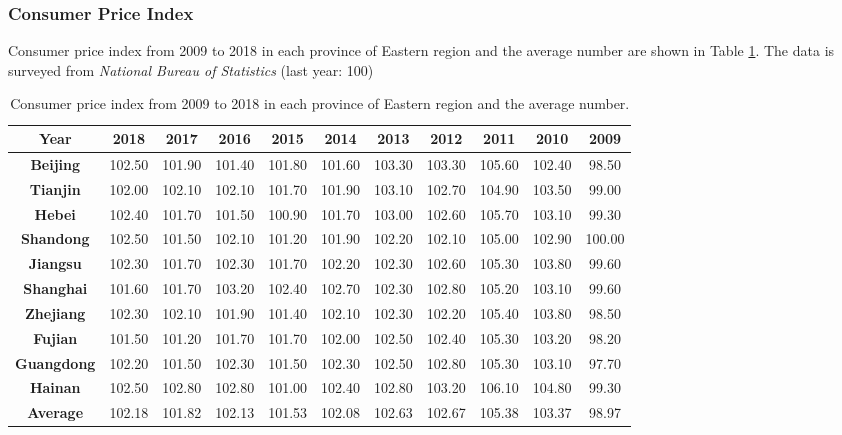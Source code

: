 \documentclass{apmcmthesis}
\begin{document}
\subsubsection{Consumer Price Index}
\hspace{2em}Consumer price index from 2009 to 2018 in each province of Eastern region and the average number are shown in Table \ref{tabel4}. The data is surveyed from \textit{National Bureau of Statistics} (last year: 100)
\begin{table}[h]
\scriptsize
\centering
\caption{Consumer price index from 2009 to 2018 in each province of Eastern region and the average number.} 
\begin{tabular}{ccccccccccc}
\toprule
  \textbf{Year} &\textbf{2018} & \textbf{2017} & \textbf{2016} & \textbf{2015} & \textbf{2014} & \textbf{2013} & \textbf{2012} & \textbf{2011} & \textbf{2010} & \textbf{2009}  \\
\midrule
   \textbf{Beijing} & 102.50  & 101.90  & 101.40  & 101.80  & 101.60  & 103.30  & 103.30  & 105.60  & 102.40  & 98.50 \\
   \textbf{Tianjin} & 102.00  & 102.10  & 102.10  & 101.70  & 101.90  & 103.10  & 102.70  & 104.90  & 103.50  & 99.00  \\
   \textbf{Hebei}   & 102.40  & 101.70  & 101.50  & 100.90  & 101.70  & 103.00  & 102.60  & 105.70  & 103.10  & 99.30   \\
   \textbf{Shandong}& 102.50  & 101.50  & 102.10  & 101.20  & 101.90  & 102.20  & 102.10  & 105.00  & 102.90  & 100.00 \\
   \textbf{Jiangsu} & 102.30  & 101.70  & 102.30  & 101.70  & 102.20  & 102.30  & 102.60  & 105.30  & 103.80  & 99.60   \\
   \textbf{Shanghai}& 101.60  & 101.70  & 103.20  & 102.40  & 102.70  & 102.30  & 102.80  & 105.20  & 103.10  & 99.60 \\
   \textbf{Zhejiang}& 102.30  & 102.10  & 101.90  & 101.40  & 102.10  & 102.30  & 102.20  & 105.40  & 103.80  & 98.50  \\
   \textbf{Fujian}  & 101.50  & 101.20  & 101.70  & 101.70  & 102.00  & 102.50  & 102.40  & 105.30  & 103.20  & 98.20    \\
   \textbf{Guangdong}&102.20  & 101.50  & 102.30  & 101.50  & 102.30  & 102.50  & 102.80  & 105.30  & 103.10  & 97.70  \\
   \textbf{Hainan}  & 102.50  & 102.80  & 102.80  & 101.00  & 102.40  & 102.80  & 103.20  & 106.10  & 104.80  & 99.30    \\
   \textbf{Average} & 102.18 & 101.82 & 102.13 & 101.53 & 102.08 & 102.63 & 102.67 & 105.38 & 103.37 & 98.97\\
\bottomrule
\end{tabular}\label{tabel4}
\end{table}
\end{document}
